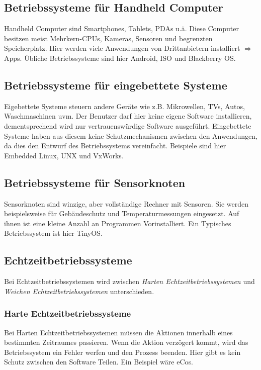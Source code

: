 \subsection{Betriebssysteme für Handheld Computer}

Handheld Computer sind Smartphones, Tablets, PDAs u.ä. Diese Computer besitzen meist Mehrkern-CPUs, Kameras, Sensoren und begrenzten Speicherplatz. Hier werden viele Anwendungen von Drittanbietern installiert $\Rightarrow$ Apps. Übliche Betriebssysteme sind hier Android, ISO und Blackberry OS.

\subsection{Betriebssysteme für eingebettete Systeme}

Eigebettete Systeme steuern andere Geräte wie z.B. Mikrowellen, TVs, Autos, Waschmaschinen uvm. Der Benutzer darf hier keine eigene Software installieren, dementsprechend wird nur vertrauenswürdige Software ausgeführt. Eingebettete Systeme haben aus diesem keine Schutzmechanismen zwischen den Anwendungen, da dies den Entwurf des Betriebssystems vereinfacht. Beispiele sind hier Embedded Linux, UNX und VxWorks.

\subsection{Betriebssysteme für Sensorknoten}

Sensorknoten sind winzige, aber vollständige Rechner mit Sensoren. Sie werden beispielsweise für Gebäudeschutz und Temperaturmessungen eingesetzt. Auf ihnen ist eine kleine Anzahl an Programmen Vorinstalliert. Ein Typisches Betriebssystem ist hier TinyOS.

\subsection{Echtzeitbetriebssysteme}

Bei Echtzeitbetriebssystemen wird zwischen \textit{Harten Echtzeitbetriebssystemen} und \textit{Weichen Echtzeitbetriebssystemen} unterschieden.

\subsubsection*{Harte Echtzeitbetriebssysteme}

Bei Harten Echtzeitbetriebssystemen müssen die Aktionen innerhalb eines bestimmten Zeitraumes passieren. Wenn die Aktion verzögert kommt, wird das Betriebssystem ein Fehler werfen und den Prozess beenden. Hier gibt es kein Schutz zwischen den Software Teilen. Ein Beispiel wäre eCos.

